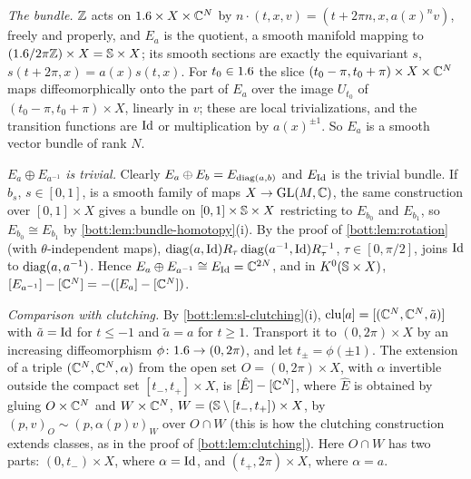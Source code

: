 \subsection*{}
\emph{The bundle.} $\mathbb{Z}$ acts on $1.6\times X\times\mathbb{C}^N$ by
$n\cdot(t,x,v)=(t+2\pi n,x,a(x)^nv)$, freely and properly, and $E_a$ is the quotient, a smooth
manifold mapping to $(1.6/2\pi\mathbb{Z})\times X=\mathbb{S}\times X$; its smooth sections are exactly the
equivariant $s$, $s(t+2\pi,x)=a(x)s(t,x)$. For $t_0\in1.6$ the slice
$(t_0-\pi,t_0+\pi)\times X\times\mathbb{C}^N$ maps diffeomorphically onto the part of $E_a$ over the
image $U_{t_0}$ of $(t_0-\pi,t_0+\pi)\times X$, linearly in $v$; these are local
trivializations, and the transition functions are $\operatorname{Id}$ or multiplication by $a(x)^{\pm1}$.
So $E_a$ is a smooth vector bundle of rank $N$.

\emph{$E_a\oplus E_{a^{-1}}$ is trivial.} Clearly $E_a\oplus E_b=E_{\operatorname{diag}(a,b)}$ and $E_{\operatorname{Id}}$ is
the trivial bundle. If $b_s$, $s\in[0,1]$, is a smooth family of maps $X\to\operatorname{GL}(M,\mathbb{C})$, the same
construction over $[0,1]\times X$ gives a bundle on $[0,1]\times\mathbb{S}\times X$ restricting to
$E_{b_0}$ and $E_{b_1}$, so $E_{b_0}\cong E_{b_1}$ by \cref{bott:lem:bundle-homotopy}(i). By the
proof of \cref{bott:lem:rotation} (with $\theta$-independent maps),
$\operatorname{diag}(a,\operatorname{Id})R_\tau\operatorname{diag}(a^{-1},\operatorname{Id})R_\tau^{-1}$, $\tau\in[0,\pi/2]$, joins $\operatorname{Id}$ to
$\operatorname{diag}(a,a^{-1})$. Hence $E_a\oplus E_{a^{-1}}\cong E_{\operatorname{Id}}=\mathbb{C}^{2N}$, and in $K^0(\mathbb{S}\times X)$,
$[E_{a^{-1}}]-[\mathbb{C}^N]=-([E_a]-[\mathbb{C}^N])$.

\emph{Comparison with clutching.} By \cref{bott:lem:sl-clutching}(i),
$\operatorname{clu}[a]=[(\mathbb{C}^N,\mathbb{C}^N,\tilde a)]$ with $\tilde a=\operatorname{Id}$ for $t\le-1$ and $\tilde a=a$
for $t\ge1$. Transport it to $(0,2\pi)\times X$ by an increasing diffeomorphism
$\phi\colon1.6\to(0,2\pi)$, and let $t_\pm=\phi(\pm1)$. The extension of a triple
$(\mathbb{C}^N,\mathbb{C}^N,\alpha)$ from the open set $O=(0,2\pi)\times X$, with $\alpha$ invertible outside the
compact set $[t_-,t_+]\times X$, is $[\hat E]-[\mathbb{C}^N]$, where $\hat E$ is obtained by gluing
$O\times\mathbb{C}^N$ and $W\times\mathbb{C}^N$, $W=(\mathbb{S}\setminus[t_-,t_+])\times X$, by
$(p,v)_O\sim(p,\alpha(p)v)_W$ over $O\cap W$ (this is how the clutching construction extends
classes, as in the proof of \cref{bott:lem:clutching}). Here $O\cap W$ has two parts:
$(0,t_-)\times X$, where $\alpha=\operatorname{Id}$, and $(t_+,2\pi)\times X$, where $\alpha=a$.

